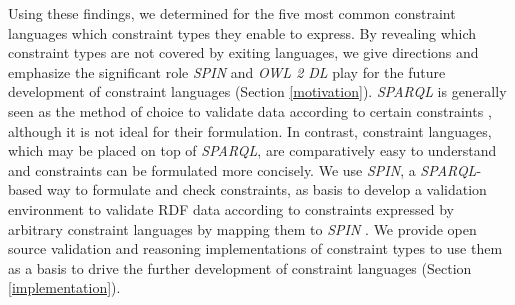 \documentclass{acm_proc_article-sp}
\begin{document}
Using these findings, we determined for the five most common constraint languages which constraint types they enable to express.
By revealing which constraint types are not covered by exiting languages, 
we give directions and emphasize the significant role \emph{SPIN} and \emph{OWL 2 DL} play for the future development of constraint languages (Section \ref{motivation}).
\emph{SPARQL} is generally seen as the method of choice to validate data according to certain constraints \cite{Fuerber2010}, 
although it is not ideal for their formulation. 
In contrast, constraint languages, which may be placed on top of \emph{SPARQL}, are comparatively easy to understand and constraints can be formulated more concisely. 
We use \emph{SPIN}, 
a \emph{SPARQL}-based way to formulate and check constraints, as basis to develop a
validation environment to validate RDF data according to constraints expressed by arbitrary constraint languages by mapping them to \emph{SPIN} \cite{BoschEckert2014-2}.
We provide open source validation and reasoning implementations of constraint types to use them as a basis to drive the further development of constraint languages (Section \ref{implementation}).
\end{document}
